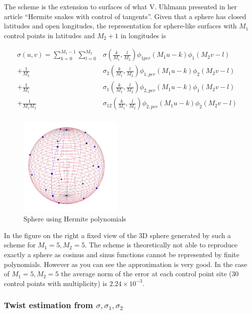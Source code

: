 \documentclass[a4paper, 11pt]{article}
\begin{document}
The scheme is the extension to surfaces of what V. Uhlmann presented in her article “Hermite snakes with control of 
tangents”. Given that a sphere has closed latitudes and open longitudes, the representation for sphere-like surfaces 
with $M_1$ control points in latitudes and $M_2+1$ in longitudes is 


\begin{align*}
  \sigma(u,v) = \sum_{k=0}^{M_1-1} \sum_{l=0}^{M_2} & \sigma\left(\frac{k}{M_1}, \frac{l}{M_2} \right) \phi_{1 
  per}(M_1u-k)\phi_{1}(M_2v-l) \\
  +\frac{1}{M_2} & \sigma_2\left(\frac{k}{M_1}, \frac{l}{M_2} \right) \phi_{1, per}(M_1u-k)\phi_{2}(M_2v-l) \\
  +\frac{1}{M_1} & \sigma_1\left(\frac{k}{M_1}, \frac{l}{M_2} \right) \phi_{2, per}(M_1u-k)\phi_{1}(M_2v-l) \\
  +\frac{1}{M_1 M_2} & \sigma_{12}\left(\frac{k}{M_1}, \frac{l}{M_2} \right) \phi_{2, per}(M_1u-k)\phi_{2}(M_2v-l) \\
\end{align*}

\begin{figure}
  \includegraphics[width=0.45\textwidth]{sphere_5_5_pol.png}
  \caption{Sphere using Hermite polynomials}
\end{figure}

In the figure on the right a fixed view of the 3D sphere generated by such a scheme for $M_1=5, M_2=5$.  The scheme is 
theoretically not able to reproduce exactly a sphere as cosinus and sinus functions cannot be represented by finite 
polynomials. However as you can see the approximation is very good. In the case of $M_1=5, M_2=5$ the average norm of 
the error at each control point site (30 control points with multiplicity) is $2.24\times 10^{-3}$.


\subsubsection{Twist estimation from $\sigma, \sigma_1, \sigma_2$}
\end{document}
